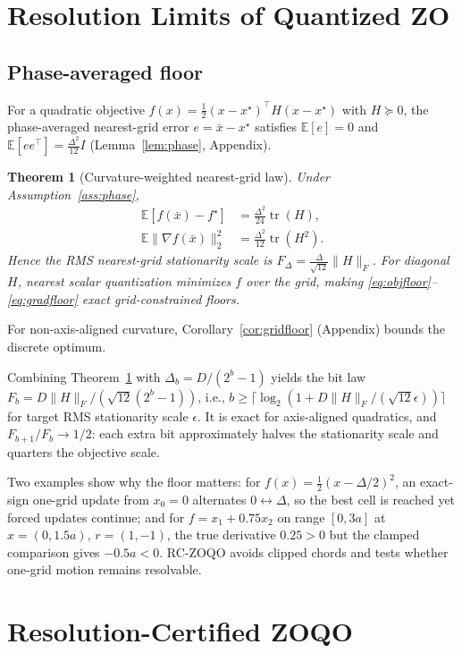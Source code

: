 \documentclass{article}
\newtheorem{theorem}{Theorem}
\newcommand{\E}{\mathbb{E}}
\newcommand{\D}{\Delta}
\begin{document}
\section{Resolution Limits of Quantized ZO}
\label{sec:floor}
\subsection{Phase-averaged floor}
For a quadratic objective $f(x)=\frac12(x-x^\star)^\top H(x-x^\star)$ with $H\succeq0$, the phase-averaged nearest-grid error $e=\bar x-x^\star$ satisfies $\E[e]=0$ and $\E[ee^\top]=\frac{\D^2}{12}I$ (Lemma~\ref{lem:phase}, Appendix).

\begin{theorem}[Curvature-weighted nearest-grid law]
\label{thm:floor}
Under Assumption~\ref{ass:phase},
\begin{align}
\E[f(\bar x)-f^\star] &= \frac{\D^2}{24}\operatorname{tr}(H), \label{eq:objfloor}\\
\E\|\nabla f(\bar x)\|_2^2 &= \frac{\D^2}{12}\operatorname{tr}(H^2). \label{eq:gradfloor}
\end{align}
Hence the RMS nearest-grid stationarity scale is $F_{\D}=\frac{\D}{\sqrt{12}}\|H\|_F$. For diagonal $H$, nearest scalar quantization minimizes $f$ over the grid, making \eqref{eq:objfloor}--\eqref{eq:gradfloor} exact grid-constrained floors.
\end{theorem}

For non-axis-aligned curvature, Corollary~\ref{cor:gridfloor} (Appendix) bounds the discrete optimum.

Combining Theorem~\ref{thm:floor} with $\D_b=D/(2^b-1)$ yields the bit law $F_b=D\|H\|_F/(\sqrt{12}(2^b-1))$, i.e., $b\ge\lceil\log_2(1+D\|H\|_F/(\sqrt{12}\epsilon))\rceil$ for target RMS stationarity scale $\epsilon$. It is exact for axis-aligned quadratics, and $F_{b+1}/F_b\to1/2$: each extra bit approximately halves the stationarity scale and quarters the objective scale.

Two examples show why the floor matters: for $f(x)=\frac12(x-\D/2)^2$, an exact-sign one-grid update from $x_0=0$ alternates $0\leftrightarrow\D$, so the best cell is reached yet forced updates continue; and for $f=x_1+0.75x_2$ on range $[0,3a]$ at $x=(0,1.5a)$, $r=(1,-1)$, the true derivative $0.25>0$ but the clamped comparison gives $-0.5a<0$. RC-ZOQO avoids clipped chords and tests whether one-grid motion remains resolvable.

\section{Resolution-Certified ZOQO}
\label{sec:method}
\end{document}
